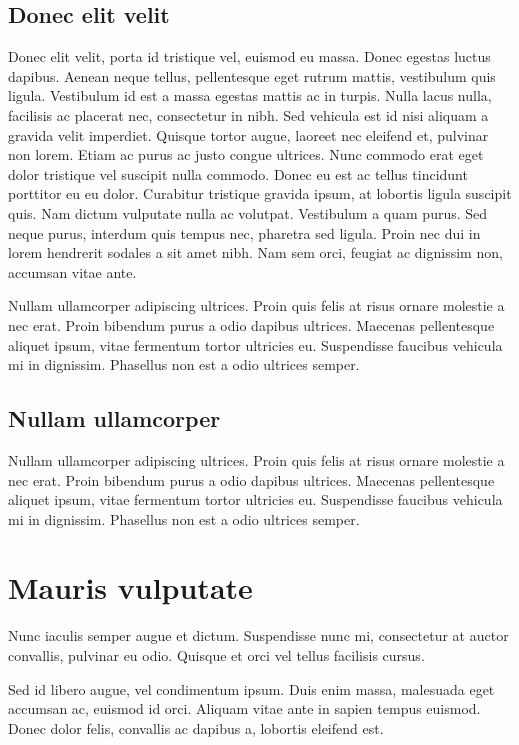\subsection{Donec elit velit}

Donec elit velit, porta id tristique vel, euismod eu massa. Donec egestas luctus dapibus. Aenean neque tellus, pellentesque eget rutrum mattis, vestibulum quis ligula. Vestibulum id est a massa egestas mattis ac in turpis. Nulla lacus nulla, facilisis ac placerat nec, consectetur in nibh. Sed vehicula est id nisi aliquam a gravida velit imperdiet. Quisque tortor augue, laoreet nec eleifend et, pulvinar non lorem. Etiam ac purus ac justo congue ultrices. Nunc commodo erat eget dolor tristique vel suscipit nulla commodo. Donec eu est ac tellus tincidunt porttitor eu eu dolor. Curabitur tristique gravida ipsum, at lobortis ligula suscipit quis. Nam dictum vulputate nulla ac volutpat. Vestibulum a quam purus. Sed neque purus, interdum quis tempus nec, pharetra sed ligula. Proin nec dui in lorem hendrerit sodales a sit amet nibh. Nam sem orci, feugiat ac dignissim non, accumsan vitae ante. 

Nullam ullamcorper adipiscing ultrices. Proin quis felis at risus ornare molestie a nec erat. Proin bibendum purus a odio dapibus ultrices. Maecenas pellentesque aliquet ipsum, vitae fermentum tortor ultricies eu. Suspendisse faucibus vehicula mi in dignissim. Phasellus non est a odio ultrices semper.

\subsection{Nullam ullamcorper}

Nullam ullamcorper adipiscing ultrices. Proin quis felis at risus ornare molestie a nec erat. Proin bibendum purus a odio dapibus ultrices. Maecenas pellentesque aliquet ipsum, vitae fermentum tortor ultricies eu. Suspendisse faucibus vehicula mi in dignissim. Phasellus non est a odio ultrices semper.


\section{Mauris vulputate}

Nunc iaculis semper augue et dictum. Suspendisse nunc mi, consectetur at auctor convallis, pulvinar eu odio. Quisque et orci vel tellus facilisis cursus. 

Sed id libero augue, vel condimentum ipsum. Duis enim massa, malesuada eget accumsan ac, euismod id orci. Aliquam vitae ante in sapien tempus euismod. Donec dolor felis, convallis ac dapibus a, lobortis eleifend est. 

